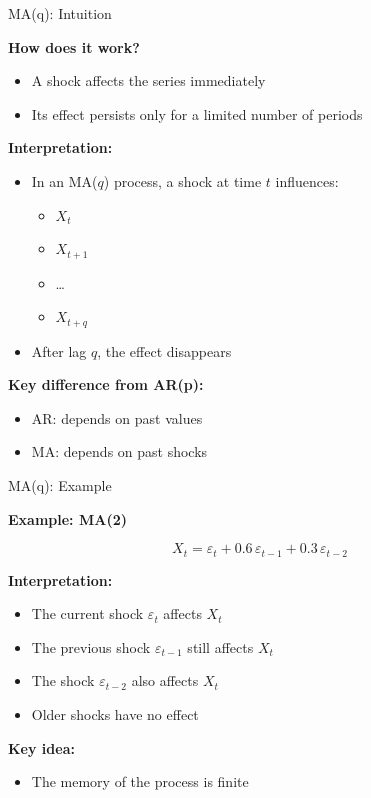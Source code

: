 \documentclass[aspectratio=169]{beamer}
\begin{document}
\begin{frame}{MA(q): Intuition}

\textbf{How does it work?}

\begin{itemize}
    \item A shock affects the series immediately
    \item Its effect persists only for a limited number of periods
\end{itemize}

\vspace{0.4cm}

\textbf{Interpretation:}
\begin{itemize}
    \item In an MA($q$) process, a shock at time $t$ influences:
    \begin{itemize}
        \item $X_t$
        \item $X_{t+1}$
        \item \dots
        \item $X_{t+q}$
    \end{itemize}
    \item After lag $q$, the effect disappears
\end{itemize}

\vspace{0.4cm}

\textbf{Key difference from AR(p):}
\begin{itemize}
    \item AR: depends on past values
    \item MA: depends on past shocks
\end{itemize}

\end{frame}

\begin{frame}{MA(q): Example}

\textbf{Example: MA(2)}

\[
X_t = \varepsilon_t + 0.6\,\varepsilon_{t-1} + 0.3\,\varepsilon_{t-2}
\]

\vspace{0.4cm}

\textbf{Interpretation:}
\begin{itemize}
    \item The current shock $\varepsilon_t$ affects $X_t$
    \item The previous shock $\varepsilon_{t-1}$ still affects $X_t$
    \item The shock $\varepsilon_{t-2}$ also affects $X_t$
    \item Older shocks have no effect
\end{itemize}

\vspace{0.4cm}

\textbf{Key idea:}
\begin{itemize}
    \item The memory of the process is finite
\end{itemize}

\end{frame}
\end{document}
